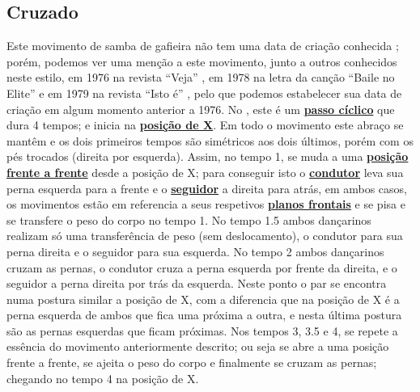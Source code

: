 \subsection{Cruzado}

Este movimento de samba de gafieira não tem uma data de criação conhecida \cite[pp. 143]{perna2002samba};
porém, podemos ver uma menção a este movimento, junto a outros conhecidos neste estilo,
em 1976 na revista ``Veja'' \cite[pp. 158]{1976veja},
em 1978 na letra da canção ``Baile no Elite'' \cite{BaileNoElite}  e 
em 1979 na revista ``Isto é'' \cite[pp. 89]{revista1979isto},
pelo que podemos estabelecer sua data de criação em algum momento anterior a 1976.
No \AnoLivro, este é um \hyperref[def:PassoCiclico]{\textbf{passo cíclico}} que dura 4 tempos;
e inicia na \hyperref[def:X-position]{\textbf{posição de X}}.
Em todo o movimento este abraço se mantêm e os dois primeiros tempos 
são simétricos aos dois últimos, porém com os pés trocados (direita por esquerda). 
Assim, no tempo 1, 
se muda a uma \hyperref[def:frente-frente-position]{\textbf{posição frente a frente}} desde a posição de X;
para conseguir isto o \hyperref[def:Condutor]{\textbf{condutor}} 
leva sua perna esquerda para a frente e o \hyperref[def:Seguidor]{\textbf{seguidor}}  a direita para atrás,
em ambos casos, os movimentos estão em referencia a seus 
respetivos \hyperref[def:PlanoFrontal]{\textbf{planos frontais}} e 
se pisa e se transfere o peso do corpo no tempo 1.
No tempo 1.5 ambos dançarinos realizam só uma transferência de peso (sem deslocamento),
o condutor para sua perna direita e o seguidor para sua esquerda.
No tempo 2 ambos dançarinos cruzam as pernas, 
o condutor cruza a perna esquerda por frente da direita, e o seguidor a perna direita por trás da esquerda.
Neste ponto o par se encontra numa postura similar a posição de X, 
com a diferencia que na posição de X é a perna esquerda de ambos que fica uma próxima a outra,
e nesta última postura são as pernas esquerdas que ficam próximas.
Nos tempos 3, 3.5 e 4, se repete a essência do movimento anteriormente descrito;
ou seja se abre a uma posição frente a frente, se ajeita o peso do corpo e finalmente se cruzam as pernas;
chegando no tempo 4 na posição de X.


